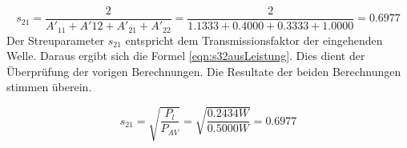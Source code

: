 \begin{equation}\label{eqn:s21ausA}
	s_{21} = \frac{2}{A'_{11}+A'{12}+A'_{21}+A'_{22}}
	=
	\frac{2}{1.1333+0.4000+0.3333+1.0000}
	= 0.6977
\end{equation}
Der Streuparameter $s_{21}$ entspricht dem Transmissionsfaktor der eingehenden Welle. Daraus ergibt sich die Formel \ref{eqn:s32ausLeistung}. Dies dient der Überprüfung der vorigen Berechnungen. Die Resultate der beiden Berechnungen stimmen überein.

\begin{equation} \label{eqn:s32ausLeistung}
	s_{21} = \sqrt{ \frac {P_l}{P_{AV}}} = \sqrt{ \frac{0.2434W} {0.5000W}} = 0.6977
\end{equation}
